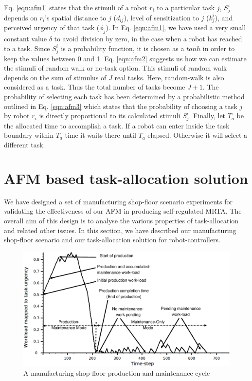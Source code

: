 \documentclass[preprint,12pt]{elsarticle}
\begin{document}
Eq. \ref{eqn:afm1} states that the stimuli of a robot $r_i$ to a particular task $j$, $S^{i}_{j}$ depends on $r_i$'s spatial distance to $j$ ($d_{ij}$), level of sensitization to $j$ ($k_{j}^{i}$), and perceived urgency of that task ($\phi _{j}$). In  Eq. \ref{eqn:afm1}, we have used a very small constant value $\delta$ to avoid division by zero, in the case when a robot has reached to a task. Since $S^{i}_{j}$ is a probability function, it is chosen as a $tanh$ in order to keep the values between 0 and 1. Eq. \ref{eqn:afm2} suggests us how we can estimate the stimuli of random walk or no-task option. This stimuli of random walk depends on the sum of stimulus of $J$ real tasks. Here, random-walk is also considered as a task. Thus the total number of tasks become $J+1$. The probability of selecting each task has been determined by a probabilistic method outlined in Eq. \ref{eqn:afm3} which states that the probability of choosing a task $j$ by robot $r_i$ is directly proportional to its calculated stimuli $ S^i_j$. Finally, let $T_a$ be the allocated time to accomplish a task. If a robot can enter inside the task boundary within $T_a$ time it waits there until $T_a$ elapsed. Otherwise it will select a different task.
\section{AFM based task-allocation solution}
\label{sec:mrta}
We have designed a set of  manufacturing shop-floor scenario experiments for validating the effectiveness of our AFM in producing self-regulated MRTA.  The overall aim of this design is to analyse the various properties of task-allocation and related other issues. In this section, we have described our manufacturing shop-floor scenario and our task-allocation solution for robot-controllers.
\begin{figure}
\centering
\includegraphics[width=12cm, angle=0]
{./images/VSP.eps}
\caption{A manufacturing shop-floor production and maintenance cycle}
\label{fig:vsp}  %
\end{figure}
\end{document}
